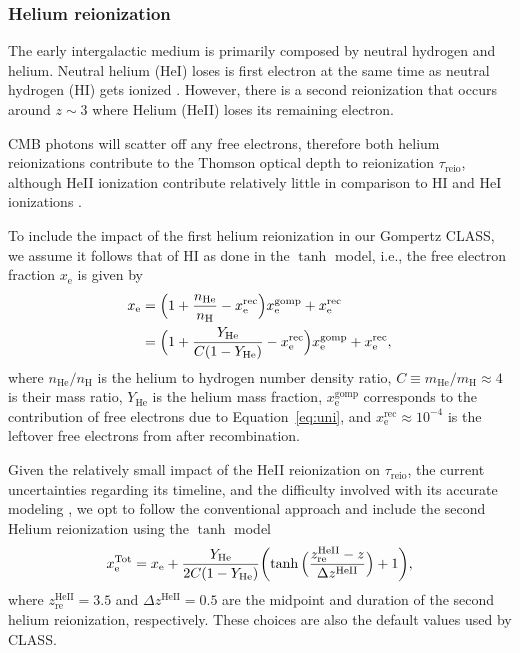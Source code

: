 \documentclass[12pt]{article}
\newcommand{\He}{\mathrm{He}}
\newcommand{\HeII}{\mathrm{HeII}}
\newcommand{\e}{\mathrm{e}}
\newcommand{\re}{\mathrm{re}}
\newcommand{\reio}{\mathrm{reio}}
\newcommand{\rec}{\mathrm{rec}}
\newcommand{\gomp}{\mathrm{gomp}}
\begin{document}
\subsubsection*{Helium reionization}
\label{sec:helium}

The early intergalactic medium is primarily composed by neutral hydrogen
and helium.
Neutral helium (HeI) loses is first electron at the same time as neutral
hydrogen (HI) gets ionized \cite{Trac2007}.
However, there is a second reionization that occurs around $z\sim3$
where Helium (HeII) loses its remaining electron.

CMB photons will scatter off any free electrons, therefore both helium
reionizations contribute to the Thomson optical depth to reionization
$\tau_\reio$, although HeII ionization contribute relatively little in
comparison to HI and HeI ionizations \cite{Liu2016}.

To include the impact of the first helium reionization in our Gompertz
\textsc{CLASS}, we assume it follows that of HI as done in the $\tanh$
model, i.e., the free electron fraction $x_\e$ is given by
%
\begin{align}
\label{eq:xe_H_He}
x_\e
&= \Bigl(1 + \frac{n_\He}{n_\mathrm{H}} - x^\rec_\e\Bigr) x_\e^\gomp
  + x^\rec_\e
\nonumber\\
%
&= \Bigl(1 + \frac{Y_\He}{C (1 - Y_\He)} - x^\rec_\e\Bigr) x_\e^\gomp
  + x^\rec_\e,
\end{align}
%
where $n_\He / n_\mathrm{H}$ is the helium to hydrogen number density
ratio, $C \equiv m_\He / m_\mathrm{H} \approx 4$ is their mass ratio,
$Y_\He$ is the helium mass fraction, $x_\e^\gomp$ corresponds to the
contribution of free electrons due to Equation~\eqref{eq:uni}, and $x^\rec_\e
\approx 10^{-4}$ is the leftover free electrons from after
recombination.

Given the relatively small impact of the HeII reionization on
$\tau_\reio$, the current uncertainties regarding its timeline, and the
difficulty involved with its accurate modeling \cite{Hotinli2023,
Upton2020}, we opt to follow the conventional approach and include the
second Helium reionization using the $\tanh$ model
%
\begin{equation}
\label{eq:xe_tot}
x_\e^\mathrm{Tot} = x_\e + \frac{Y_\He}{2C(1 - Y_\He)}
  \biggl(\tanh{\Bigl(\frac{z_\re^\HeII - z}{\Delta z^\HeII}\Bigr)} + 1\biggr),
\end{equation}
%
where $z_\re^\HeII = 3.5$ and $\Delta z^\HeII = 0.5$ are the midpoint
and duration of the second helium reionization, respectively.
These choices are also the default values used by \textsc{CLASS}.
\end{document}

